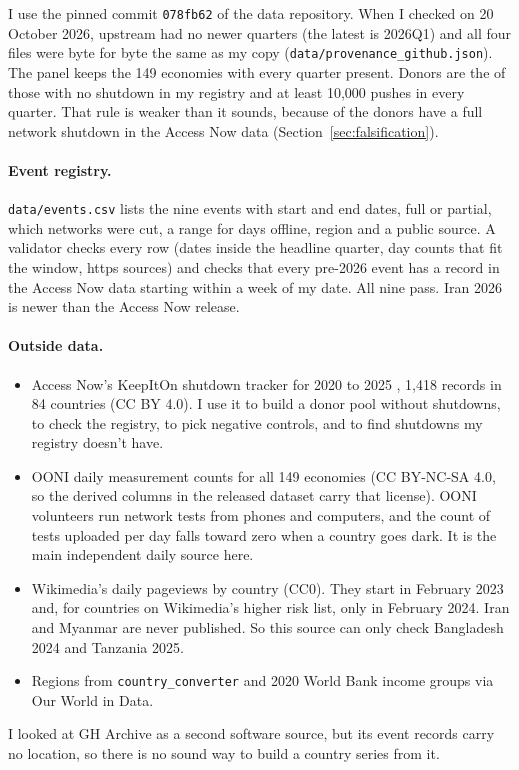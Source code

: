 \documentclass[11pt]{article}
\begin{document}
I use the pinned commit \texttt{078fb62} of the data repository. When I checked on 20 October 2026, upstream had no newer quarters (the latest is 2026Q1) and all four files were byte for byte the same as my copy (\texttt{data/provenance\_github.json}). The panel keeps the 149 economies with every quarter present. Donors are the \ndonors{} of those with no shutdown in my registry and at least 10,000 pushes in every quarter. That rule is weaker than it sounds, because \nkioexcluded{} of the donors have a full network shutdown in the Access Now data (Section~\ref{sec:falsification}).

\paragraph{Event registry.} \texttt{data/events.csv} lists the nine events with start and end dates, full or partial, which networks were cut, a range for days offline, region and a public source. A validator checks every row (dates inside the headline quarter, day counts that fit the window, https sources) and checks that every pre-2026 event has a record in the Access Now data starting within a week of my date. All nine pass. Iran 2026 is newer than the Access Now release.

\paragraph{Outside data.}
\begin{itemize}
\item Access Now's KeepItOn shutdown tracker for 2020 to 2025 \citep{keepiton}, 1,418 records in 84 countries (CC BY 4.0). I use it to build a donor pool without shutdowns, to check the registry, to pick negative controls, and to find shutdowns my registry doesn't have.
\item OONI daily measurement counts for all 149 economies \citep{ooni} (CC BY-NC-SA 4.0, so the derived columns in the released dataset carry that license). OONI volunteers run network tests from phones and computers, and the count of tests uploaded per day falls toward zero when a country goes dark. It is the main independent daily source here.
\item Wikimedia's daily pageviews by country \citep{wikimedia} (CC0). They start in February 2023 and, for countries on Wikimedia's higher risk list, only in February 2024. Iran and Myanmar are never published. So this source can only check Bangladesh 2024 and Tanzania 2025.
\item Regions from \texttt{country\_converter} and 2020 World Bank income groups via Our World in Data.
\end{itemize}
I looked at GH Archive as a second software source, but its event records carry no location, so there is no sound way to build a country series from it.
\end{document}
